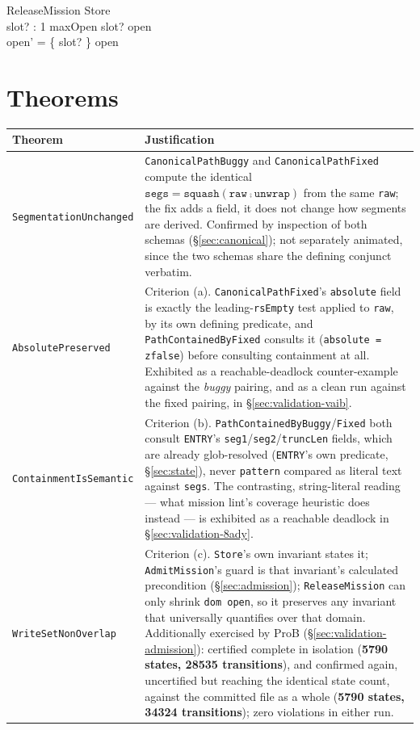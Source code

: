 \documentclass[a4paper,10pt,fleqn]{article}
\newcommand{\field}[1]{\texttt{#1}}
\begin{document}
\begin{schema}{ReleaseMission}
\Delta Store \\
slot? : 1 \upto maxOpen
\where
slot? \in \dom open \\
open' = \{ slot? \} \ndres open
\end{schema}

\section{Theorems}
\label{sec:theorems}

\begin{center}
\begin{tabularx}{\textwidth}{@{}lX@{}}
\toprule
\textbf{Theorem} & \textbf{Justification} \\
\midrule
\field{SegmentationUnchanged} &
  \field{CanonicalPathBuggy} and \field{CanonicalPathFixed} compute
  the identical $\field{segs} = \field{squash}(\field{raw} \comp \field{unwrap})$ from
  the same \field{raw}; the fix adds a field, it does not change how
  segments are derived. Confirmed by inspection of both schemas
  (\S\ref{sec:canonical}); not separately animated, since the two
  schemas share the defining conjunct verbatim. \\
\field{AbsolutePreserved} &
  Criterion (a). \field{CanonicalPathFixed}'s \field{absolute} field
  is exactly the leading-\field{rsEmpty} test applied to \field{raw},
  by its own defining predicate, and
  \field{PathContainedByFixed} consults it
  (\field{absolute = zfalse}) before consulting containment at all.
  Exhibited as a reachable-deadlock counter-example against the
  \emph{buggy} pairing, and as a clean run against the fixed pairing,
  in \S\ref{sec:validation-vaib}. \\
\field{ContainmentIsSemantic} &
  Criterion (b). \field{PathContainedByBuggy}/\field{Fixed} both
  consult \field{ENTRY}'s \field{seg1}/\field{seg2}/\field{truncLen}
  fields, which are already glob-resolved
  (\field{ENTRY}'s own predicate, \S\ref{sec:state}), never
  \field{pattern} compared as literal text against \field{segs}. The
  contrasting, string-literal reading --- what mission lint's
  coverage heuristic does instead --- is exhibited as a reachable
  deadlock in \S\ref{sec:validation-8ady}. \\
\field{WriteSetNonOverlap} &
  Criterion (c). \field{Store}'s own invariant states it;
  \field{AdmitMission}'s guard is that invariant's calculated
  precondition (\S\ref{sec:admission}); \field{ReleaseMission} can
  only shrink \field{dom\ open}, so it preserves any invariant that
  universally quantifies over that domain. Additionally exercised by
  ProB (\S\ref{sec:validation-admission}): certified complete in
  isolation (\textbf{5790 states, 28535 transitions}), and confirmed
  again, uncertified but reaching the identical state count, against
  the committed file as a whole (\textbf{5790 states, 34324
  transitions}); zero violations in either run. \\
\bottomrule
\end{tabularx}
\end{center}
\end{document}
